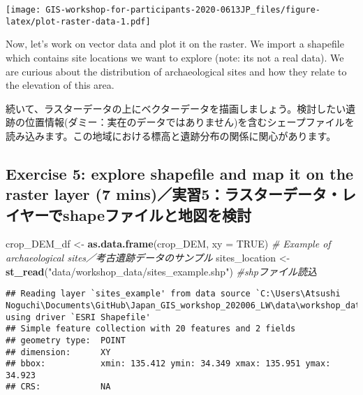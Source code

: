 \documentclass[
  xelatex,ja=standard]{bxjsarticle}
\newenvironment{Shaded}{\begin{snugshade}}{\end{snugshade}}
\newcommand{\CommentTok}[1]{\textcolor[rgb]{0.56,0.35,0.01}{\textit{#1}}}
\newcommand{\DataTypeTok}[1]{\textcolor[rgb]{0.13,0.29,0.53}{#1}}
\newcommand{\KeywordTok}[1]{\textcolor[rgb]{0.13,0.29,0.53}{\textbf{#1}}}
\newcommand{\NormalTok}[1]{#1}
\newcommand{\OtherTok}[1]{\textcolor[rgb]{0.56,0.35,0.01}{#1}}
\newcommand{\StringTok}[1]{\textcolor[rgb]{0.31,0.60,0.02}{#1}}
\begin{document}
\texttt{[image: GIS-workshop-for-participants-2020-0613JP\_files/figure-latex/plot-raster-data-1.pdf]}

Now, let's work on vector data and plot it on the raster. We import a
shapefile which contains site locations we want to explore (note: its
not a real data). We are curious about the distribution of
archaeological sites and how they relate to the elevation of this area.

続いて、ラスターデータの上にベクターデータを描画しましょう。検討したい遺跡の位置情報(ダミー：実在のデータではありません)を含むシェープファイルを読み込みます。この地域における標高と遺跡分布の関係に関心があります。

\hypertarget{exercise-5-explore-shapefile-and-map-it-on-the-raster-layer-7-minsux5b9fux7fd25ux30e9ux30b9ux30bfux30fcux30c7ux30fcux30bfux30ecux30a4ux30e4ux30fcux3067shapeux30d5ux30a1ux30a4ux30ebux3068ux5730ux56f3ux3092ux691cux8a0e}{%
\subsection{Exercise 5: explore shapefile and map it on the raster layer
(7
mins)／実習5：ラスターデータ・レイヤーでshapeファイルと地図を検討}\label{exercise-5-explore-shapefile-and-map-it-on-the-raster-layer-7-minsux5b9fux7fd25ux30e9ux30b9ux30bfux30fcux30c7ux30fcux30bfux30ecux30a4ux30e4ux30fcux3067shapeux30d5ux30a1ux30a4ux30ebux3068ux5730ux56f3ux3092ux691cux8a0e}}

\begin{Shaded}
\begin{Highlighting}[]
\NormalTok{crop_DEM_df <-}\StringTok{ }\KeywordTok{as.data.frame}\NormalTok{(crop_DEM, }\DataTypeTok{xy =} \OtherTok{TRUE}\NormalTok{)}
\CommentTok{# Example of archaeological sites／考古遺跡データのサンプル  }
\NormalTok{sites_location <-}\StringTok{ }\KeywordTok{st_read}\NormalTok{(}\StringTok{"data/workshop_data/sites_example.shp"}\NormalTok{) }\CommentTok{#shpファイル読込}
\end{Highlighting}
\end{Shaded}

\begin{verbatim}
## Reading layer `sites_example' from data source `C:\Users\Atsushi Noguchi\Documents\GitHub\Japan_GIS_workshop_202006_LW\data\workshop_data\sites_example.shp' using driver `ESRI Shapefile'
## Simple feature collection with 20 features and 2 fields
## geometry type:  POINT
## dimension:      XY
## bbox:           xmin: 135.412 ymin: 34.349 xmax: 135.951 ymax: 34.923
## CRS:            NA
\end{verbatim}
\end{document}
